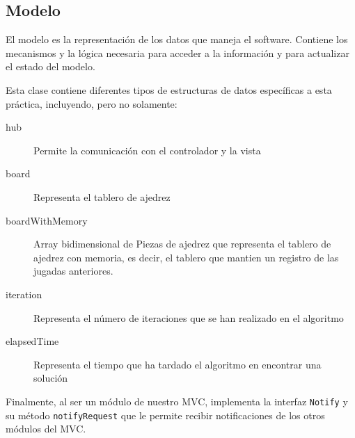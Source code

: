 \subsection{Modelo}

El modelo es la representación de los datos que maneja el software. Contiene los mecanismos y la lógica necesaria para acceder a la información y para actualizar el estado del modelo.\bigskip

Esta clase contiene diferentes tipos de estructuras de datos específicas a esta práctica, incluyendo, pero no solamente: \\

\begin{description}
\item[hub] Permite la comunicación con el controlador y la vista
\item[board] Representa el tablero de ajedrez
\item[boardWithMemory] Array bidimensional de Piezas de ajedrez que representa el tablero de ajedrez con memoria, es decir, el tablero que mantien un registro de las jugadas anteriores.
\item[iteration] Representa el número de iteraciones que se han realizado en el algoritmo
\item[elapsedTime] Representa el tiempo que ha tardado el algoritmo en encontrar una solución
\end{description}

Finalmente, al ser un módulo de nuestro MVC, implementa la interfaz \texttt{Notify} y su método \texttt{notifyRequest} que le permite recibir notificaciones de los otros módulos del MVC.
